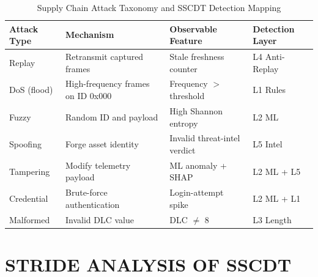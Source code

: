 \documentclass[12pt,a4paper]{amritareport}
\begin{document}
\begin{table}[H]
\centering
\caption{Supply Chain Attack Taxonomy and SSCDT Detection Mapping}
\label{tab:attack_taxonomy}
\begin{tabular}{@{}P{2.4cm}P{3.6cm}P{3.2cm}P{3cm}@{}}
\toprule
\textbf{Attack Type} & \textbf{Mechanism} & \textbf{Observable Feature} & \textbf{Detection Layer} \\
\midrule
Replay & Retransmit captured frames & Stale freshness counter & L4 Anti-Replay \\
DoS (flood) & High-frequency frames on ID 0x000 & Frequency $>$ threshold & L1 Rules \\
Fuzzy & Random ID and payload & High Shannon entropy & L2 ML \\
Spoofing & Forge asset identity & Invalid threat-intel verdict & L5 Intel \\
Tampering & Modify telemetry payload & ML anomaly + SHAP & L2 ML + L5 \\
Credential & Brute-force authentication & Login-attempt spike & L2 ML + L1 \\
Malformed & Invalid DLC value & DLC $\neq$ 8 & L3 Length \\
\bottomrule
\end{tabular}
\end{table}

\section{STRIDE ANALYSIS OF SSCDT}
\end{document}
